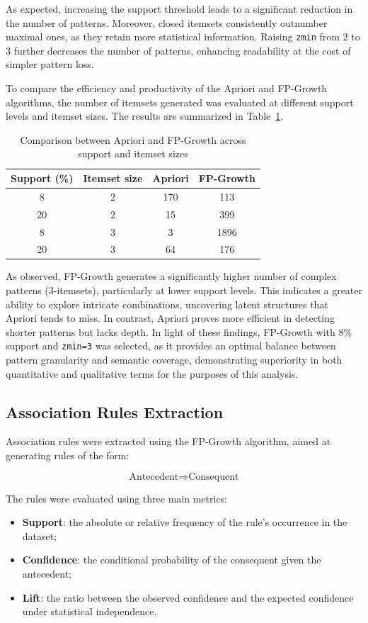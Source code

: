\documentclass[10pt]{article}
\begin{document}
As expected, increasing the support threshold leads to a significant reduction in the number of patterns. Moreover, closed itemsets consistently outnumber maximal ones, as they retain more statistical information. Raising \texttt{zmin} from 2 to 3 further decreases the number of patterns, enhancing readability at the cost of simpler pattern loss.

To compare the efficiency and productivity of the Apriori and FP-Growth algorithms, the number of itemsets generated was evaluated at different support levels and itemset sizes. The results are summarized in Table~\ref{tab:algo_comparison}.

\begin{table}[H]
\centering
\caption{Comparison between Apriori and FP-Growth across support and itemset sizes}
\label{tab:algo_comparison}
\begin{tabular}{|c|c|c|c|}
\hline
\textbf{Support (\%)} & \textbf{Itemset size} & \textbf{Apriori} & \textbf{FP-Growth} \\
\hline
8 & 2 & 170 & 113 \\
20 & 2 & 15 & 399 \\
8 & 3 & 3 & 1896 \\
20 & 3 & 64 & 176 \\
\hline
\end{tabular}
\end{table}

As observed, FP-Growth generates a significantly higher number of complex patterns (3-itemsets), particularly at lower support levels. This indicates a greater ability to explore intricate combinations, uncovering latent structures that Apriori tends to miss. In contrast, Apriori proves more efficient in detecting shorter patterns but lacks depth.
In light of these findings, FP-Growth with 8\% support and \texttt{zmin=3} was selected, as it provides an optimal balance between pattern granularity and semantic coverage, demonstrating superiority in both quantitative and qualitative terms for the purposes of this analysis.


\subsection{Association Rules Extraction}
Association rules were extracted using the FP-Growth algorithm, aimed at generating rules of the form:

\[
\text{Antecedent} \Rightarrow \text{Consequent}
\]

The rules were evaluated using three main metrics:
\begin{itemize}
  \item \textbf{Support}: the absolute or relative frequency of the rule's occurrence in the dataset;
  \item \textbf{Confidence}: the conditional probability of the consequent given the antecedent;
  \item \textbf{Lift}: the ratio between the observed confidence and the expected confidence under statistical independence.
\end{itemize}
\end{document}
